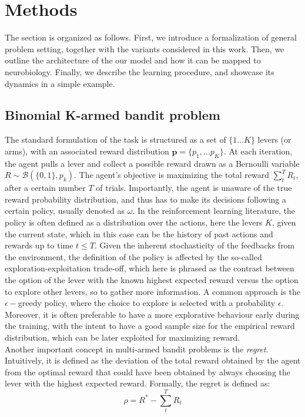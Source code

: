 

\section{Methods}

\noindent The section is organized as follows. First, we introduce a formalization of general problem setting, together with the variants considered in this work. Then, we outline the architecture of the our model and how it can be mapped to neurobiology. Finally, we describe the learning procedure,
and showcase its dynamics in a simple example.

\subsection{Binomial K-armed bandit problem}
\hfill \break
\noindent The standard formulation of the task is structured as a set of $\{1\dots K\}$ levers (or arms), with an associated reward distribution $\mathbf{p}=\{p_{1}, \ldots p_{K}\}$. At each iteration, the agent pulls a lever and collect a possible reward drawn as a Bernoulli variable $R\sim
\mathcal{B}(\{0,1\},p_{k})$. The agent's objective is maximizing the total reward
$\sum^{T}_{t} R_{t}$, after a certain number $T$ of trials. Importantly, the agent is unaware of the true reward probability distribution, and thus has to make its decisions following a certain policy, usually denoted as $\omega$. In the reinforcement learning literature, the policy is often defined as
a distribution over the actions, here the levers $K$, given the current state, which in this case can be the history of past actions and rewards up to time $t\leq T$. Given the inherent stochasticity of the feedbacks from the environment, the definition of the policy is affected by the so-called
exploration-exploitation trade-off, which here is phrased as the contrast between the option of the lever with the known highest expected reward versus the option to explore other levers, so to gather more information. A common approach is the $\epsilon-$greedy policy, where the choice to explore is
selected with a probability $\epsilon$. Moreover, it is often preferable to have a more explorative behaviour early during the training, with the intent to have a good sample size for the empirical reward distribution, which can be later exploited for maximizing reward.\\
Another important concept in multi-armed bandit problems is the \textit{regret}. Intuitively, it is defined as the deviation of the total reward obtained by the agent from the optimal reward that could have been obtained by always choosing the lever with the highest expected reward. Formally, the regret is defined as:
\begin{equation}
    \rho=R^{*} - \sum^{T}_{t} R_{t}
\end{equation}

